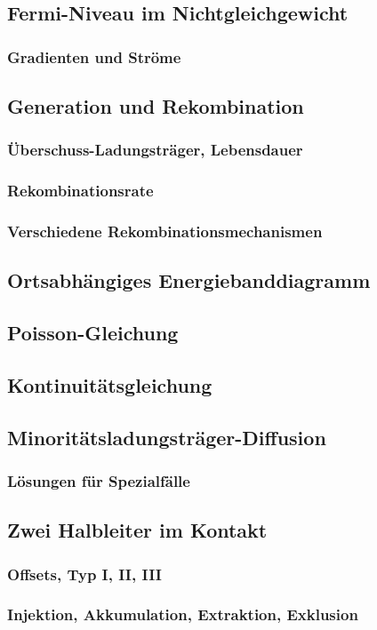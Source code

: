 \subsection{Fermi-Niveau im Nichtgleichgewicht}
	\subsubsection{Gradienten und Ströme}
\subsection{Generation und Rekombination}
	\subsubsection{Überschuss-Ladungsträger, Lebensdauer}
	\subsubsection{Rekombinationsrate}
	\subsubsection{Verschiedene Rekombinationsmechanismen}
\subsection{Ortsabhängiges Energiebanddiagramm}
\subsection{Poisson-Gleichung}
\subsection{Kontinuitätsgleichung}
\subsection{Minoritätsladungsträger-Diffusion}
	\subsubsection{Lösungen für Spezialfälle}
\subsection{Zwei Halbleiter im Kontakt}
	\subsubsection{Offsets, Typ I, II, III}
	\subsubsection{Injektion, Akkumulation, Extraktion, Exklusion}

